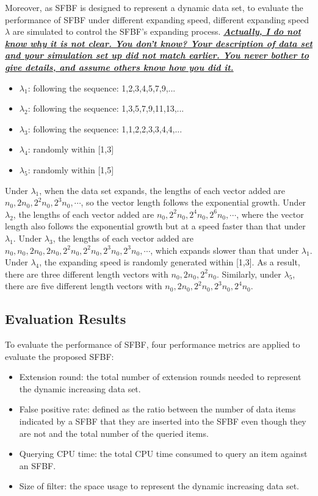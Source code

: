 \documentclass[10pt,journal,letterpaper]{IEEEtran}
\newcommand{\note}[1]{{\sffamily\itshape\bfseries\uline{#1}}}
\begin{document}
Moreover, as SFBF is designed to represent a dynamic data set, to evaluate the performance of SFBF under different expanding speed, different expanding speed $\lambda $ are simulated to control the SFBF's expanding process. \note{Actually, I do not know why it is not clear. You don't know? Your description of data set and your simulation set up did not match earlier. You never bother to give details, and assume others know how you did it.}
\begin{itemize}
  \item $\lambda_1$: following the sequence: 1,2,3,4,5,7,9,...
  \item $\lambda_2$: following the sequence: 1,3,5,7,9,11,13,...
  \item $\lambda_3$: following the sequence: 1,1,2,2,3,3,4,4,...
  \item $\lambda_4$: randomly  within [1,3]
  \item $\lambda_5$: randomly  within [1,5]
\end{itemize}

Under  $\lambda_1$, when the data set expands, the lengths of each vector added are  ${n_0},2{n_0},{2^2}{n_0},{2^3}{n_0}, \cdots$, so the vector length follows the exponential growth. Under  $\lambda_2$, the lengths of each vector added are  ${n_0},{2^2}{n_0},{2^4}{n_0}, {2^6}{n_0},\cdots$, where the vector length also follows the exponential growth but at a speed faster than that under $\lambda_1$. Under  $\lambda_3$, the lengths of each vector added are  ${n_0},{n_0}, 2{n_0},2{n_0},{2^2}{n_0},{2^2}{n_0},{2^3}{n_0}, {2^3}{n_0},\cdots$, which expands slower than that under  $\lambda_1$.  Under $\lambda_4$, the expanding speed is randomly generated within [1,3]. As a result, there are three different length vectors with  ${n_0},2{n_0},{2^2}{n_0}$. Similarly, under $\lambda_5$, there are five different length vectors with  ${n_0},2{n_0},{2^2}{n_0},{2^3}{n_0},{2^4}{n_0}$.
\subsection{Evaluation Results}

To evaluate the performance of SFBF, four performance metrics are applied to evaluate the proposed SFBF:
\begin{itemize}
  \item  Extension round: the total number of extension rounds needed to represent the dynamic increasing data set.
  \item  False positive rate: defined as the ratio between the number
of data items indicated by a SFBF that they are inserted into the SFBF
even though they are not and the total number of the queried items.
  \item  Querying CPU time: the total CPU time consumed to query an item against an SFBF.
  \item Size of filter: the space usage to represent the dynamic increasing data set.
\end{itemize}
\end{document}
